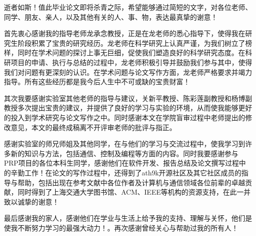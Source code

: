 
\begin{thanks}

  逝者如斯！值此毕业论文即将杀青之际，希望能够通过简短的文字，对各位老师、同学、朋友、亲人，以及其他有关的人、事、物，表达最真挚的谢意！
  
  首先衷心感谢我的指导老师龙承念教授，正是在龙老师的悉心指导下，使得我在研究生阶段积累了宝贵的研究经历。龙老师在科学研究上认真严谨，为我们树立了榜样，同时在学术问题的探讨上事无巨细，促使我们塑造良好的科学研究态度。在科研项目的申请、执行与总结的过程中，龙老师积极引导并鼓励我们参与其中，使得我们对问题有更深刻的认识。在学术问题与论文写作方面，龙老师严格要求并竭力指导。所有这些经历都是我今后人生中不可或缺的宝贵财富！
  
  其次我要感谢实验室其他老师的指导与建议，关新平教授、陈彩莲副教授和杨博副教授多次提出宝贵的建议，并提供了良好的学习与实验的环境，从而使我能够更好的投入到学术研究与论文写作之中。同时感谢本文在学院盲审过程中老师提出的修改意见，本文的最终成稿离不开评审老师的批评与指正。
  
  感谢实验室的师兄师姐及其他同学，在与他们的学习与交流过程中，使我学习到许多新的知识与方法，包括通信、控制及编程等方面的内容。同时我要感谢参与PRP项目的各位本科生同学，感谢他们在软件开发、报告总结及论文撰写过程中的辛勤工作！在论文的写作过程中，还得到了ath9k开源社区及其它社区成员的指导与帮助，包括出现在参考文献中各位作者及计算机与通信领域各位前辈的卓越贡献，同时得到了上海交通大学图书馆、ACM、IEEE等机构的资源支持，在此一并致以诚挚的谢意！

  最后感谢我的家人，感谢他们在学业与生活上给予我的支持、理解与关怀，他们是使我不断努力学习的最强大动力！。再次感谢曾经关心与帮助过我的所有人！

\end{thanks}
